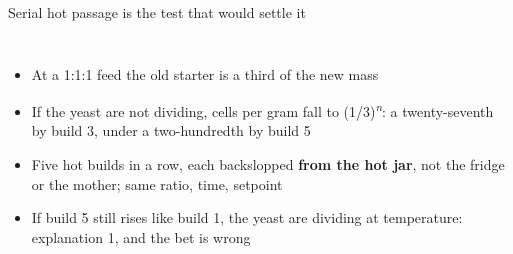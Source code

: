 \documentclass[aspectratio=169,11pt]{beamer}
\begin{document}
\begin{frame}{Serial hot passage is the test that would settle it \untested}
  \begin{columns}[T]
      \begin{itemize}\footnotesize
        \item At a 1:1:1 feed the old starter is a third of the new mass
        \item If the yeast are not dividing, cells per gram fall to
          (1/3)\textsuperscript{\emph{n}}: a twenty-seventh by build 3, under a
          two-hundredth by build 5
        \item Five hot builds in a row, each backslopped \textbf{from the hot jar}, not
          the fridge or the mother; same ratio, time, setpoint
        \item If build 5 still rises like build 1, the yeast are dividing at
          temperature: explanation 1, and the bet is wrong
      \end{itemize}
      \centering
  \end{columns}
\end{frame}
\end{document}
